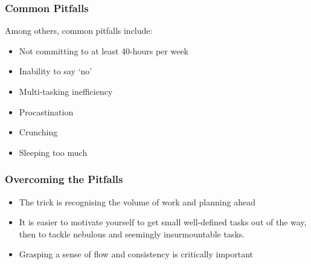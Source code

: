 \begin{frame}
	\frametitle{Common Pitfalls}
	
	Among others, common pitfalls include:
	
	\begin{itemize}
		\item Not committing to at least 40-hours per week
		\item Inability to say `no'
		\item Multi-tasking inefficiency
		\item Procastination
		\item Crunching
		\item Sleeping too much		
	\end{itemize}

\end{frame}
		
\begin{frame}
	\frametitle{Overcoming the Pitfalls}
	
	\begin{itemize}
		\item The trick is recognising the volume of work and planning ahead
		\item It is easier to motivate yourself to get small well-defined tasks out of the way, then to tackle nebulous and seemingly insurmountable tasks.
		\item Grasping a sense of flow and consistency is critically important	
	\end{itemize}

\end{frame}



%	
%	
%	
%	
%	
%	
%	

